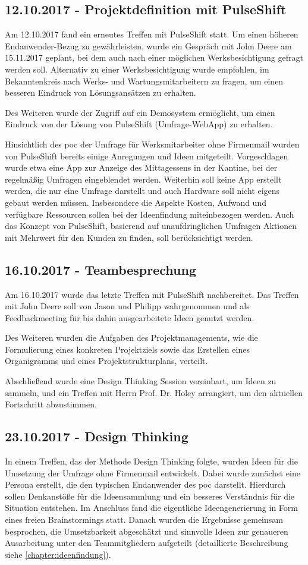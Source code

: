 \subsection{12.10.2017 - Projektdefinition mit PulseShift}
Am 12.10.2017 fand ein erneutes Treffen mit PulseShift statt. Um einen höheren Endanwender-Bezug zu gewährleisten, wurde ein Gespräch mit John Deere am 15.11.2017 geplant, bei dem auch nach einer möglichen Werksbesichtigung gefragt werden soll. Alternativ zu einer Werksbesichtigung wurde empfohlen, im Bekanntenkreis nach Werks- und Wartungsmitarbeitern zu fragen, um einen besseren Eindruck von Lösungsansätzen zu erhalten.

Des Weiteren wurde der Zugriff auf ein Demosystem ermöglicht, um einen Eindruck von der Lösung von PulseShift (Umfrage-WebApp) zu erhalten.

Hinsichtlich des \gls{poc} der Umfrage für Werksmitarbeiter ohne Firmenmail wurden von PulseShift bereits einige Anregungen und Ideen mitgeteilt. Vorgeschlagen wurde etwa eine App zur Anzeige des Mittagessens in der Kantine, bei der regelmäßig Umfragen eingeblendet werden. Weiterhin soll keine App erstellt werden, die nur eine Umfrage darstellt und auch Hardware soll nicht eigens gebaut werden müssen. Insbesondere die Aspekte Kosten, Aufwand und verfügbare Ressourcen sollen bei der Ideenfindung miteinbezogen werden. Auch das Konzept von PulseShift, basierend auf unaufdringlichen Umfragen Aktionen mit Mehrwert für den Kunden zu finden, soll berücksichtigt werden.

\subsection{16.10.2017 - Teambesprechung}
Am 16.10.2017 wurde das letzte Treffen mit PulseShift nachbereitet. Das Treffen mit John Deere soll von Jason und Philipp wahrgenommen und als Feedbackmeeting für bis dahin ausgearbeitete Ideen genutzt werden.

Des Weiteren wurden die Aufgaben des Projektmanagements, wie die Formulierung eines konkreten Projektziels sowie das Erstellen eines Organigramms und eines Projektstrukturplans, verteilt.

Abschließend wurde eine Design Thinking Session vereinbart, um Ideen zu sammeln, und ein Treffen mit Herrn Prof. Dr. Holey arrangiert, um den aktuellen Fortschritt abzustimmen.

\subsection{23.10.2017 - Design Thinking}
In einem Treffen, das der Methode Design Thinking folgte, wurden Ideen für die Umsetzung der Umfrage ohne Firmenmail entwickelt. Dabei wurde zunächst eine Persona erstellt, die den typischen Endanwender des \gls{poc} darstellt. Hierdurch sollen Denkanstöße für die Ideensammlung und ein besseres Verständnis für die Situation entstehen. Im Anschluss fand die eigentliche Ideengenerierung in Form eines freien Brainstormings statt. Danach wurden die Ergebnisse gemeinsam besprochen, die Umsetzbarkeit abgeschätzt und sinnvolle Ideen zur genaueren Ausarbeitung unter den Teammitgliedern aufgeteilt (detaillierte Beschreibung siehe \vref{chapter:ideenfindung}).

